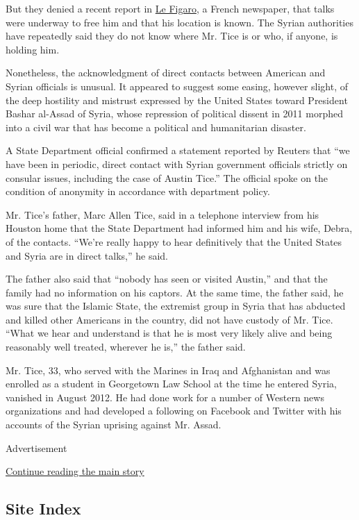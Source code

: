 But they denied a recent report in
\href{http://www.lefigaro.fr/international/2015/03/20/01003-20150320ARTFIG00446-washington-et-damas-discutent-d-un-otage.php}{Le
Figaro}, a French newspaper, that talks were underway to free him and
that his location is known. The Syrian authorities have repeatedly said
they do not know where Mr. Tice is or who, if anyone, is holding him.

Nonetheless, the acknowledgment of direct contacts between American and
Syrian officials is unusual. It appeared to suggest some easing, however
slight, of the deep hostility and mistrust expressed by the United
States toward President Bashar al-Assad of Syria, whose repression of
political dissent in 2011 morphed into a civil war that has become a
political and humanitarian disaster.

A State Department official confirmed a statement reported by Reuters
that ``we have been in periodic, direct contact with Syrian government
officials strictly on consular issues, including the case of Austin
Tice.'' The official spoke on the condition of anonymity in accordance
with department policy.

Mr. Tice's father, Marc Allen Tice, said in a telephone interview from
his Houston home that the State Department had informed him and his
wife, Debra, of the contacts. ``We're really happy to hear definitively
that the United States and Syria are in direct talks,'' he said.

The father also said that ``nobody has seen or visited Austin,'' and
that the family had no information on his captors. At the same time, the
father said, he was sure that the Islamic State, the extremist group in
Syria that has abducted and killed other Americans in the country, did
not have custody of Mr. Tice. ``What we hear and understand is that he
is most very likely alive and being reasonably well treated, wherever he
is,'' the father said.

Mr. Tice, 33, who served with the Marines in Iraq and Afghanistan and
was enrolled as a student in Georgetown Law School at the time he
entered Syria, vanished in August 2012. He had done work for a number of
Western news organizations and had developed a following on Facebook and
Twitter with his accounts of the Syrian uprising against Mr. Assad.

Advertisement

\protect\hyperlink{after-bottom}{Continue reading the main story}

\hypertarget{site-index}{%
\subsection{Site Index}\label{site-index}}

